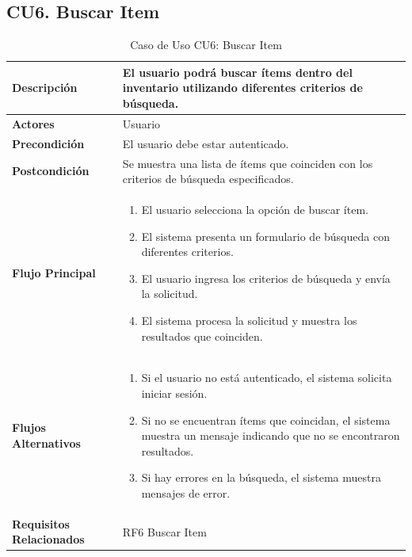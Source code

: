 \documentclass{article}
\begin{document}
\subsection{CU6. Buscar Item}
\begin{table}[H]
    \centering
    \begin{tabular}{|l|p{10cm}|}
        \hline
        \textbf{Descripción} & El usuario podrá buscar ítems dentro del inventario utilizando diferentes criterios de búsqueda. \\ \hline
        \textbf{Actores} & Usuario \\ \hline
        \textbf{Precondición} & El usuario debe estar autenticado. \\ \hline
        \textbf{Postcondición} & Se muestra una lista de ítems que coinciden con los criterios de búsqueda especificados. \\ \hline
        \textbf{Flujo Principal} & 
        \begin{enumerate}
            \item El usuario selecciona la opción de buscar ítem.
            \item El sistema presenta un formulario de búsqueda con diferentes criterios.
            \item El usuario ingresa los criterios de búsqueda y envía la solicitud.
            \item El sistema procesa la solicitud y muestra los resultados que coinciden.
        \end{enumerate} \\ \hline
        \textbf{Flujos Alternativos} & 
        \begin{enumerate}
            \item Si el usuario no está autenticado, el sistema solicita iniciar sesión.
            \item Si no se encuentran ítems que coincidan, el sistema muestra un mensaje indicando que no se encontraron resultados.
            \item Si hay errores en la búsqueda, el sistema muestra mensajes de error.
        \end{enumerate} \\ \hline
        \textbf{Requisitos Relacionados} & RF6 Buscar Item \\ \hline
    \end{tabular}
    \caption{Caso de Uso CU6: Buscar Item}
\end{table}

\newpage
\end{document}
